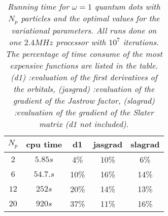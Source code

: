 \documentclass[a4paper,10pt,twocolumn]{article} %
\begin{document}

\begin{table}[h!]
\begin{center}
\begin{tabular}{|c|c|c|c|c|}
\hline
$N_{p}$ & cpu time & d1  & jasgrad  & slagrad  \\ 
\hline
\hline
 $2$  & $5.85s$ &4\% &10\% &6\%\\ 
 $6$  & $54.7.s$ & 10\% &16\% &14\%\\ 
 $12$ & $252s$ & 20\% &14\% &13\%\\ 
 $20$ & $920s$ & 37\% &11\% &16\%\\ 
\hline
\end{tabular}
\end{center}
\caption{{\it 
	Running time for $\omega=1$ quantum dots with $N_p$ particles and the optimal values for the variational parameters. All runs done on one $2.4 MHz$ processor with $10^7$ iterations.
	The percentage of time consume of the most expensive functions are listed in the table. 
	(d1) :evaluation of the first derivatives of the orbitals,
	(jasgrad)  :evaluation of the gradient of the Jastrow factor,
	(slagrad)  :evaluation of the gradient of the Slater matrix (d1 not included).
}}
\label{tab:scaletime}
\end{table}
\end{document}
